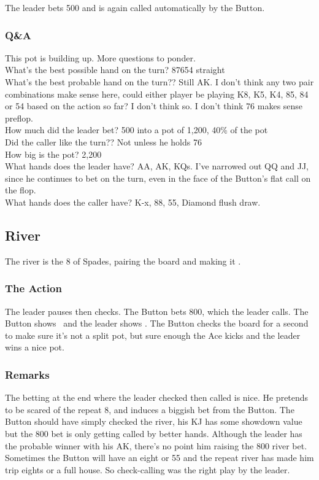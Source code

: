 The leader bets 500 and is again called automatically by
the Button.

\subsubsection*{Q\&A}

This pot is building up. More questions to ponder. \\
What's the best possible hand on the turn? 87654 straight \\
What's the best probable hand on the turn?? Still AK. I don't think any
two pair combinations make sense here, could either player be playing
K8, K5, K4, 85, 84 or 54 based on the action so far? I don't think so. I
don't think 76 makes sense preflop. \\
How much did the leader bet? 500 into a pot of 1,200, 40\% of the pot \\
Did the caller like the turn?? Not unless he holds 76 \\
How big is the pot? 2,200 \\
What hands does the leader have? AA, AK, KQs. I've narrowed out QQ and JJ,
since he continues to bet on the turn, even in the face of the Button's flat
call on the flop. \\
What hands does the caller have? K-x, 88, 55, Diamond flush draw.

\subsection*{River}
The river is the 8 of Spades, pairing the board and making
it \Kc\eigd\fived\fours\eigs.

\subsubsection*{The Action}
The leader pauses then checks. The Button bets 800, which the leader calls.
The Button shows \Kd\Jc\ and the leader shows \As\Ks. The Button
checks the board for a second to make sure it's not a split pot, but
sure enough the Ace kicks and the leader wins a nice pot.

\subsubsection*{Remarks}
The betting at the end where the leader checked then called is nice. He
pretends to be scared of the repeat 8, and induces a biggish bet from the
Button. The Button should have simply checked the river, his KJ has some
showdown value but the 800 bet is only getting called by better hands.
Although the leader has the probable winner with his AK, there's no point
him raising the 800 river bet. Sometimes the Button will have an eight
or 55 and the repeat river has made him trip eights or a full house.
So check-calling was the right play by the leader.

